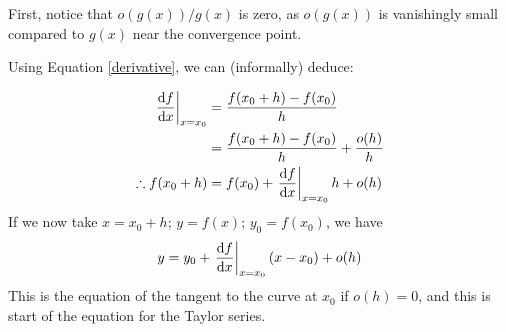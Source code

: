 First, notice that \(o(g(x))/g(x)\) is zero, as \(o(g(x))\) is vanishingly small compared to \(g(x)\) near the convergence point.

Using Equation \eqref{derivative}, we can (informally) deduce:

\begin{align*}
	\eval{\frac{\dd{f}}{\dd{x}}}_{x=x_0} & = \frac{f(x_0 + h) - f(x_0)}{h}                          \\
	                                     & = \frac{f(x_0 + h) - f(x_0)}{h} + \frac{o(h)}{h}         \\
	\therefore f(x_0 + h)                & = f(x_0) + \eval{\frac{\dd{f}}{\dd{x}}}_{x=x_0} h + o(h)
\end{align*}
If we now take \(x=x_0+h;\,y=f(x);\,y_0=f(x_0)\), we have
\[
	y = y_0 + \eval{\frac{\dd{f}}{\dd{x}}}_{x=x_0}(x - x_0) + o(h)
\]
This is the equation of the tangent to the curve at \(x_0\) if \(o(h)=0\), and this is start of the equation for the Taylor series.

